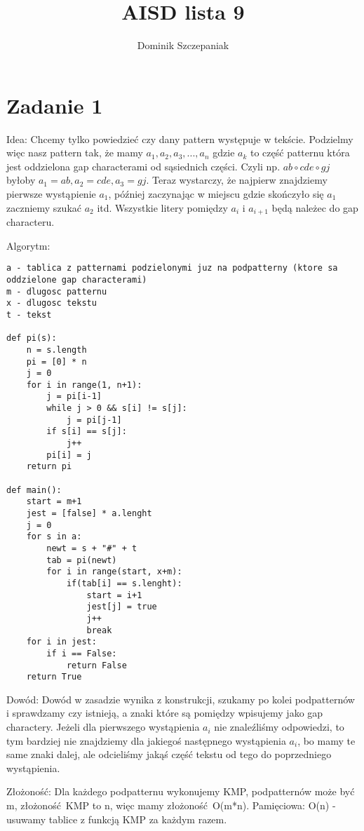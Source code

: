 \documentclass[12pt]{article}
\title{AISD lista 9}
\author{Dominik Szczepaniak}
\begin{document}
\maketitle

\bgroup\obeylines

\section{Zadanie 1}
Idea: Chcemy tylko powiedzieć czy dany pattern występuje w tekście. Podzielmy więc nasz pattern tak, że mamy $a_1, a_2, a_3, ..., a_n$ gdzie $a_k$ to część patternu która jest oddzielona gap characterami od sąsiednich części. Czyli np. $ab \circ cde \circ gj$ byłoby $a_1 = ab, a_2 = cde, a_3 = gj$. Teraz wystarczy, że najpierw znajdziemy pierwsze wystąpienie $a_1$, później zaczynając w miejscu gdzie skończyło się $a_1$ zaczniemy szukać $a_2$ itd. Wszystkie litery pomiędzy $a_i$ i $a_{i+1}$ będą należec do gap characteru.

Algorytm:
\begin{lstlisting}
a - tablica z patternami podzielonymi juz na podpatterny (ktore sa oddzielone gap characterami)
m - dlugosc patternu 
x - dlugosc tekstu
t - tekst

def pi(s):
    n = s.length
    pi = [0] * n
    j = 0
    for i in range(1, n+1):
        j = pi[i-1]
        while j > 0 && s[i] != s[j]:
            j = pi[j-1]
        if s[i] == s[j]:
            j++
        pi[i] = j
    return pi 

def main():
    start = m+1
    jest = [false] * a.lenght
    j = 0
    for s in a:
        newt = s + "#" + t
        tab = pi(newt)
        for i in range(start, x+m):
            if(tab[i] == s.lenght):
                start = i+1
                jest[j] = true 
                j++
                break
    for i in jest:
        if i == False:
            return False 
    return True
\end{lstlisting}

Dowód:
Dowód w zasadzie wynika z konstrukcji, szukamy po kolei podpatternów i sprawdzamy czy istnieją, a znaki które są pomiędzy wpisujemy jako gap charactery. Jeżeli dla pierwszego wystąpienia $a_i$ nie znaleźliśmy odpowiedzi, to tym bardziej nie znajdziemy dla jakiegoś następnego wystąpienia $a_i$, bo mamy te same znaki dalej, ale odcieliśmy jakąś część tekstu od tego do poprzedniego wystąpienia. 

Złożoność:
Dla każdego podpatternu wykonujemy KMP, podpatternów może być m, złożoność KMP to n, więc mamy złożoność O(m*n).
Pamięciowa:
O(n) - usuwamy tablice z funkcją KMP za każdym razem.
\end{document}
